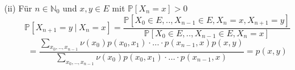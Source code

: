 (ii) Für $n \in \mathbb{N}_{0}$ und $x,y \in E$ mit $\mathbb{P}[X_{n} = x]>0$
\begin{equation*}
\mathbb{P}[X_{n+1} = y \: | \: X_{n} = x] = \dfrac{\mathbb{P}[X_{0} \in E,.., X_{n-1} \in E, X_{n} = x, X_{n+1} = y]}{\mathbb{P}[X_{0} \in E,.., X_{n-1} \in E, X_{n} = x]}
\end{equation*}
\begin{equation*}
= \dfrac{\sum_{x_{0},..,x_{n-1}} \nu(x_{0}) p(x_{0},x_{1}) \cdot ...\cdot p(x_{n-1},x)p(x,y)}{\sum_{x_{0},..,x_{n-1}} \nu(x_{0}) p(x_{0},x_{1}) \cdot ...\cdot p(x_{n-1},x)} = p(x,y)
\end{equation*}